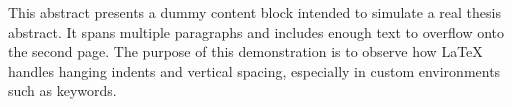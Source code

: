 This abstract presents a dummy content block intended to simulate a real thesis abstract. It spans multiple paragraphs and includes enough text to overflow onto the second page. The purpose of this demonstration is to observe how LaTeX handles hanging indents and vertical spacing, especially in custom environments such as keywords.


